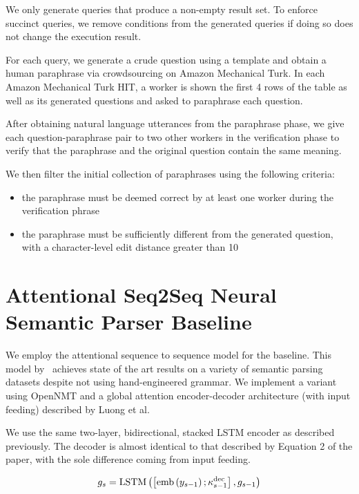 We only generate queries that produce a non-empty result set.
To enforce succinct queries, we remove conditions from the generated queries if doing so does not change the execution result.

For each query, we generate a crude question using a template and obtain a human paraphrase via crowdsourcing on Amazon Mechanical Turk.
In each Amazon Mechanical Turk HIT, a worker is shown the first 4 rows of the table as well as its generated questions and asked to paraphrase each question.

After obtaining natural language utterances from the paraphrase phase, we give each question-paraphrase pair to two other workers in the verification phase to verify that the paraphrase and the original question contain the same meaning.

We then filter the initial collection of paraphrases using the following criteria:

\begin{itemize}
\item the paraphrase must be deemed correct by at least one worker during the verification phrase
\item the paraphrase must be sufficiently different from the generated question, with a character-level edit distance greater than 10
\end{itemize}


\section{Attentional Seq2Seq Neural Semantic Parser Baseline}
\label{section:baseline}

We employ the attentional sequence to sequence model for the baseline.
This model by~\citet{dong-neural_semantic_parsing} achieves state of the art results on a variety of semantic parsing datasets despite not using hand-engineered grammar.
We implement a variant using OpenNMT and a global attention encoder-decoder architecture (with input feeding) described by Luong et al.

We use the same two-layer, bidirectional, stacked LSTM encoder as described previously.
The decoder is almost identical to that described by Equation 2 of the paper, with the sole difference coming from input feeding.

\begin{equation}
g_s = {\rm LSTM} \left(  \left[ {\rm emb} \left( y_{s-1} \right) ; \kappa^{\rm dec}_{s-1} \right]  , g_{s-1} \right)
\end{equation}

